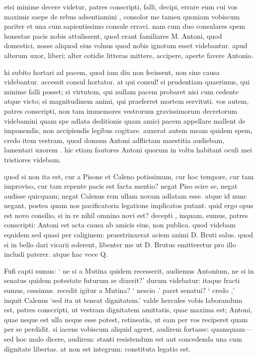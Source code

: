 
 etsi minime decere videtur, patres conscripti, falli, decipi, errare eum cui vos maximis saepe de rebus adsentiamini , consolor me tamen quoniam vobiscum pariter et una cum sapientissimo consule erravi. nam cum duo consulares spem honestae pacis nobis attulissent, quod erant familiares M. Antoni, quod domestici, nosse aliquod eius volnus quod nobis ignotum esset videbantur. apud alterum uxor, liberi; alter cotidie litteras mittere, accipere, aperte favere Antonio.

 hi subito hortari ad pacem, quod iam diu non fecissent, non sine causa videbantur. accessit consul hortator. at qui consul! si prudentiam quaerimus, qui minime falli posset; si virtutem, qui nullam pacem probaret nisi cum cedente atque victo; si magnitudinem animi, qui praeferret mortem servituti. vos autem, patres conscripti, non tam immemores vestrorum gravissimorum decretorum videbamini quam spe adlata deditionis quam amici pacem appellare mallent de imponendis, non accipiendis legibus cogitare. auxerat autem meam quidem spem, credo item vestram, quod domum Antoni adflictam maestitia audiebam, lamentari uxorem . hic etiam fautores Antoni quorum in voltu habitant oculi mei tristiores videbam.

 quod si non ita est, cur a Pisone et Caleno potissimum, cur hoc tempore, cur tam improviso, cur tam repente pacis est facta mentio? negat Piso scire se, negat audisse quicquam; negat Calenus rem ullam novam adlatam esse. atque id nunc negant, postea quam nos pacificatoria legatione implicatos putant. quid ergo opus est novo consilio, si in re nihil omnino novi est? decepti , inquam, sumus, patres conscripti: Antoni est acta causa ab amicis eius, non publica. quod videbam equidem sed quasi per caliginem: praestrinxerat aciem animi D. Bruti salus. quod si in bello dari vicarii solerent, libenter me ut D. Brutus emitteretur pro illo includi paterer. atque hac voce Q.

 Fufi capti sumus: ` ne si a Mutina quidem recesserit, audiemus Antonium, ne si in senatus quidem potestate futurum se dixerit?' durum videbatur: itaque fracti sumus, cessimus. recedit igitur a Mutina? ` nescio .' paret senatui? ` credo ,' inquit Calenus `sed ita ut teneat dignitatem.' valde hercules vobis laborandum est, patres conscripti, ut vestram dignitatem amittatis, quae maxima est; Antoni, quae neque est ulla neque esse potest, retineatis, ut eam per vos reciperet quam per se perdidit. si iacens vobiscum aliquid ageret, audirem fortasse: quamquam—sed hoc malo dicere, audirem: stanti resistendum est aut concedenda una cum dignitate libertas. at non est integrum: constituta legatio est.

